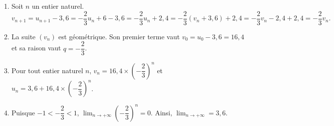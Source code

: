 \documentclass[11pt,fleqn, openany]{book} %
\begin{document}
\begin{solution}\hspace{0pt}
\begin{enumerate}
\item Soit $n$ un entier naturel. \[
v_{n+1}=u_{n+1}-3,6=-\dfrac{2}{3}u_n+6-3,6=-\dfrac{2}{3}u_n+2,4=-\dfrac{2}{3}(v_n+3,6)+2,4=-\dfrac{2}{3}v_n-2,4+2,4=-\dfrac{2}{3}v_n.\]

\item La suite $(v_n)$ est géométrique. Son premier terme vaut $v_0=u_0-3,6=16,4$ et sa raison vaut $q=-\dfrac{2}{3}$.

\item Pour tout entier naturel $n$, $v_n=16,4 \times \left(-\dfrac{2}{3}\right)^n$ et $u_n=3,6+16,4 \times \left(-\dfrac{2}{3}\right)^n$.

\item Puisque $-1<-\dfrac{2}{3}<1$, $\displaystyle\lim_{n \to + \infty} \left(-\dfrac{2}{3}\right)^n=0$. Ainsi, $\displaystyle\lim_{n \to + \infty} = 3,6$.\end{enumerate}\end{solution}
\end{document}
